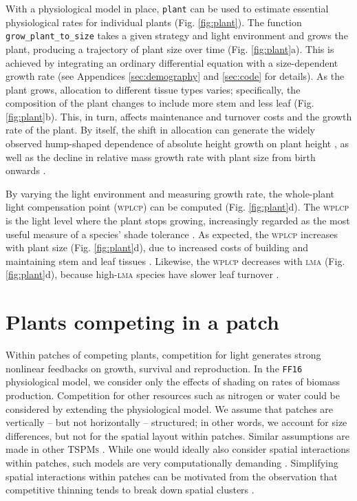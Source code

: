 \documentclass[a4paper,11pt]{article}
\newcommand{\plant}{\texttt{plant}}
\begin{document}
With a physiological model in place, {\plant} can be used to estimate
essential physiological rates for individual plants
(Fig. \ref{fig:plant}). The function \texttt{grow\_plant\_to\_size}
takes a given strategy and light environment and grows the plant,
producing a trajectory of plant size over time (Fig. \ref{fig:plant}a). This
is achieved by integrating an ordinary differential equation with a
size-dependent growth rate (see Appendices \ref{sec:demography} and
\ref{sec:code} for details). As the plant grows, allocation to
different tissue types varies; specifically, the composition of the plant
changes to include more stem and less leaf
(Fig. \ref{fig:plant}b). This, in turn, affects maintenance and turnover
costs and the growth rate of the plant. By itself, the
shift in allocation can generate the widely observed hump-shaped dependence
of absolute height growth on plant height \citep[Fig. \ref{fig:plant}c;][]{King-2011}, as well as the decline in relative mass growth rate with plant size from birth onwards \citep{Enquist-2007}.

By varying the light environment and measuring growth rate, the whole-plant light compensation point (\textsc{wplcp}) can be computed (Fig.
\ref{fig:plant}d). The \textsc{wplcp} is the light level where the plant
stops growing, increasingly regarded as the most useful
measure of a species' shade tolerance
\citep{Givnish-1988, Baltzer-2007, Lusk-2013}. As expected, the \textsc{wplcp}
increases with plant size (Fig. \ref{fig:plant}d), due to increased costs of building and
maintaining stem and leaf tissues \citep{Givnish-1988}. Likewise, the \textsc{wplcp}
decreases with \textsc{lma} (Fig. \ref{fig:plant}d), because high-\textsc{lma} species have slower leaf turnover \citep{Baltzer-2007, Lusk-2013}.

\section{Plants competing in a patch}

Within patches of competing plants, competition for light generates
strong nonlinear feedbacks on growth, survival and reproduction. In the
\texttt{FF16} physiological model, we consider only the effects of
shading on rates of biomass production. Competition for other
resources such as nitrogen or water could be considered by extending the
physiological model. We assume that patches are vertically -- but not horizontally --
structured; in other words, we account for size differences, but not for the spatial
layout within patches. Similar assumptions are made in other \textsc{TSPMs}
\citep{Shugart-1980, Kohyama-1993, Huston-1987, Moorcroft-2001, Smith-2014}.
While one would ideally also consider spatial interactions within patches,
such models are very computationally demanding \citep{Shugart-1980,
Pacala-1996}. Simplifying spatial interactions within patches can be motivated from the observation
that competitive thinning tends to break down spatial clusters
\citep{Strigul-2008}.
\end{document}
